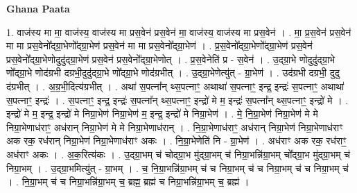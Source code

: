 \documentclass[17pt]{extarticle}
\begin{document}
\textbf{Ghana Paata } \newline

1. वाज॑स्य मा मा॒ वाज॑स्य॒ वाज॑स्य मा प्रस॒वेन॑ प्रस॒वेन॑ मा॒ वाज॑स्य॒ वाज॑स्य मा प्रस॒वेन॑ । . मा॒ प्र॒स॒वेन॑ प्रस॒वेन॑ मा मा प्रस॒वेनो᳚द्ग्रा॒भेणो᳚द्ग्रा॒भेण॑ प्रस॒वेन॑ मा मा प्रस॒वेनो᳚द्ग्रा॒भेण॑ । . प्र॒स॒वेनो᳚द्ग्रा॒भेणो᳚द्ग्रा॒भेण॑ प्रस॒वेन॑ प्रस॒वेनो᳚द्ग्रा॒भेणोदुदु॑द्ग्रा॒भेण॑ प्रस॒वेन॑ प्रस॒वेनो᳚द्ग्रा॒भेणोत् । . प्र॒स॒वेनेति॑ प्र - स॒वेन॑ । . उ॒द्ग्रा॒भे णोदुदु॑द्ग्रा॒भे णो᳚द्ग्रा॒भे णोद॑ग्रभी दग्रभी॒दुदु॑द्ग्रा॒भे णो᳚द्ग्रा॒भे णोद॑ग्रभीत् । . उ॒द्ग्रा॒भेणेत्यु॑त् - ग्रा॒भेण॑ । . उद॑ग्रभी दग्रभी॒ दुदु द॑ग्रभीत् । . अ॒ग्र॒भी॒दित्य॑ग्रभीत् । . अथा॑ स॒पत्ना᳚न् थ्स॒पत्नाꣳ॒॒ अथाथा॑ स॒पत्नाꣳ॒॒ इन्द्र॒ इन्द्रः॑ स॒पत्नाꣳ॒॒ अथाथा॑ स॒पत्नाꣳ॒॒ इन्द्रः॑ । . स॒पत्नाꣳ॒॒ इन्द्र॒ इन्द्रः॑ स॒पत्ना᳚न् थ्स॒पत्नाꣳ॒॒ इन्द्रो॑ मे म॒ इन्द्रः॑ स॒पत्ना᳚न् थ्स॒पत्नाꣳ॒॒ इन्द्रो॑ मे । . इन्द्रो॑ मे म॒ इन्द्र॒ इन्द्रो॑ मे निग्रा॒भेण॑ निग्रा॒भेण॑ म॒ इन्द्र॒ इन्द्रो॑ मे निग्रा॒भेण॑ । . मे॒ नि॒ग्रा॒भेण॑ निग्रा॒भेण॑ मे मे निग्रा॒भेणाध॑राꣳ॒॒ अध॑रान् निग्रा॒भेण॑ मे मे निग्रा॒भेणाध॑रान् । . नि॒ग्रा॒भेणाध॑राꣳ॒॒ अध॑रान् निग्रा॒भेण॑ निग्रा॒भेणाध॑राꣳ अक रक॒ रध॑रान् निग्रा॒भेण॑ निग्रा॒भेणाध॑राꣳ अकः । . नि॒ग्रा॒भेणेति॑ नि - ग्रा॒भेण॑ । . अध॑राꣳ अक रक॒ रध॑राꣳ॒॒ अध॑राꣳ अकः । . अ॒क॒रित्य॑कः । . उ॒द्ग्रा॒भम् च॑ चोद्ग्रा॒भ मु॑द्ग्रा॒भम् च॑ निग्रा॒भन्नि॑ग्रा॒भम् चो᳚द्ग्रा॒भ मु॑द्ग्रा॒भम् च॑ निग्रा॒भम् । . उ॒द्ग्रा॒भमित्यु॑त् - ग्रा॒भम् । . च॒ नि॒ग्रा॒भन्नि॑ग्रा॒भम् च॑ च निग्रा॒भम् च॑ च निग्रा॒भम् च॑ च निग्रा॒भम् च॑ । . नि॒ग्रा॒भम् च॑ च निग्रा॒भन्नि॑ग्रा॒भम् च॒ ब्रह्म॒ ब्रह्म॑ च निग्रा॒भन्नि॑ग्रा॒भम् च॒ ब्रह्म॑ । \newline
\end{document}
